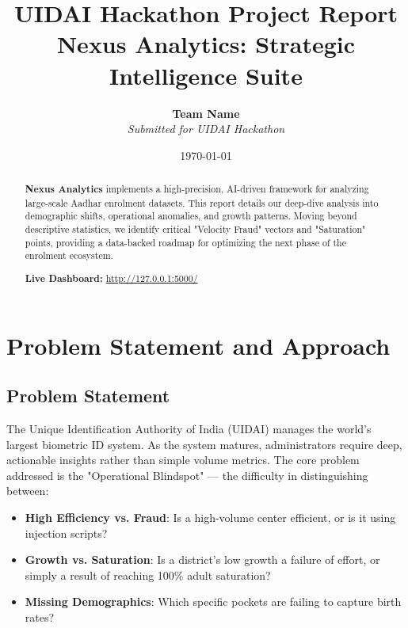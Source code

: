 \documentclass[12pt, a4paper]{article}
\title{\textbf{\Huge UIDAI Hackathon Project Report} \\ \vspace{0.5cm} \Large Nexus Analytics: Strategic Intelligence Suite}
\author{\textbf{Team Name} \\ [0.5cm] \textit{Submitted for UIDAI Hackathon}}
\date{\today}
\begin{document}
\maketitle
\thispagestyle{empty}

\begin{abstract}
    \noindent \textbf{Nexus Analytics} implements a high-precision, AI-driven framework for analyzing large-scale Aadhar enrolment datasets. This report details our deep-dive analysis into demographic shifts, operational anomalies, and growth patterns. Moving beyond descriptive statistics, we identify critical "Velocity Fraud" vectors and "Saturation" points, providing a data-backed roadmap for optimizing the next phase of the enrolment ecosystem.
    
    \vspace{0.5cm}
    \noindent \textbf{Live Dashboard:} \url{http://127.0.0.1:5000/}
\end{abstract}

\newpage
\tableofcontents
\newpage

\section{Problem Statement and Approach}

\subsection{Problem Statement}
The Unique Identification Authority of India (UIDAI) manages the world's largest biometric ID system. As the system matures, administrators require deep, actionable insights rather than simple volume metrics. The core problem addressed is the "Operational Blindspot" — the difficulty in distinguishing between:
\begin{itemize}
    \item \textbf{High Efficiency vs. Fraud}: Is a high-volume center efficient, or is it using injection scripts?
    \item \textbf{Growth vs. Saturation}: Is a district's low growth a failure of effort, or simply a result of reaching 100\% adult saturation?
    \item \textbf{Missing Demographics}: Which specific pockets are failing to capture birth rates?
\end{itemize}
\end{document}
